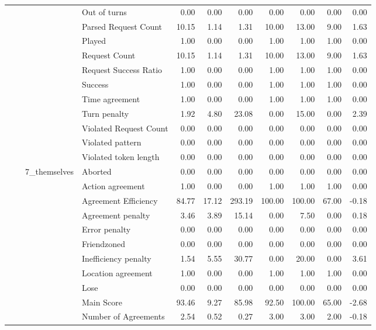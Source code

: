 \begin{tabular}{llllrrrrrrr}
 &  &  & Out of turns & 0.00 & 0.00 & 0.00 & 0.00 & 0.00 & 0.00 & 0.00 \\
 &  &  & Parsed Request Count & 10.15 & 1.14 & 1.31 & 10.00 & 13.00 & 9.00 & 1.63 \\
 &  &  & Played & 1.00 & 0.00 & 0.00 & 1.00 & 1.00 & 1.00 & 0.00 \\
 &  &  & Request Count & 10.15 & 1.14 & 1.31 & 10.00 & 13.00 & 9.00 & 1.63 \\
 &  &  & Request Success Ratio & 1.00 & 0.00 & 0.00 & 1.00 & 1.00 & 1.00 & 0.00 \\
 &  &  & Success & 1.00 & 0.00 & 0.00 & 1.00 & 1.00 & 1.00 & 0.00 \\
 &  &  & Time agreement & 1.00 & 0.00 & 0.00 & 1.00 & 1.00 & 1.00 & 0.00 \\
 &  &  & Turn penalty & 1.92 & 4.80 & 23.08 & 0.00 & 15.00 & 0.00 & 2.39 \\
 &  &  & Violated Request Count & 0.00 & 0.00 & 0.00 & 0.00 & 0.00 & 0.00 & 0.00 \\
 &  &  & Violated pattern & 0.00 & 0.00 & 0.00 & 0.00 & 0.00 & 0.00 & 0.00 \\
 &  &  & Violated token length & 0.00 & 0.00 & 0.00 & 0.00 & 0.00 & 0.00 & 0.00 \\
\cline{3-11}
 &  & \multirow[t]{27}{*}{7_themselves} & Aborted & 0.00 & 0.00 & 0.00 & 0.00 & 0.00 & 0.00 & 0.00 \\
 &  &  & Action agreement & 1.00 & 0.00 & 0.00 & 1.00 & 1.00 & 1.00 & 0.00 \\
 &  &  & Agreement Efficiency & 84.77 & 17.12 & 293.19 & 100.00 & 100.00 & 67.00 & -0.18 \\
 &  &  & Agreement penalty & 3.46 & 3.89 & 15.14 & 0.00 & 7.50 & 0.00 & 0.18 \\
 &  &  & Error penalty & 0.00 & 0.00 & 0.00 & 0.00 & 0.00 & 0.00 & 0.00 \\
 &  &  & Friendzoned & 0.00 & 0.00 & 0.00 & 0.00 & 0.00 & 0.00 & 0.00 \\
 &  &  & Inefficiency penalty & 1.54 & 5.55 & 30.77 & 0.00 & 20.00 & 0.00 & 3.61 \\
 &  &  & Location agreement & 1.00 & 0.00 & 0.00 & 1.00 & 1.00 & 1.00 & 0.00 \\
 &  &  & Lose & 0.00 & 0.00 & 0.00 & 0.00 & 0.00 & 0.00 & 0.00 \\
 &  &  & Main Score & 93.46 & 9.27 & 85.98 & 92.50 & 100.00 & 65.00 & -2.68 \\
 &  &  & Number of Agreements & 2.54 & 0.52 & 0.27 & 3.00 & 3.00 & 2.00 & -0.18 \\

\end{tabular}
